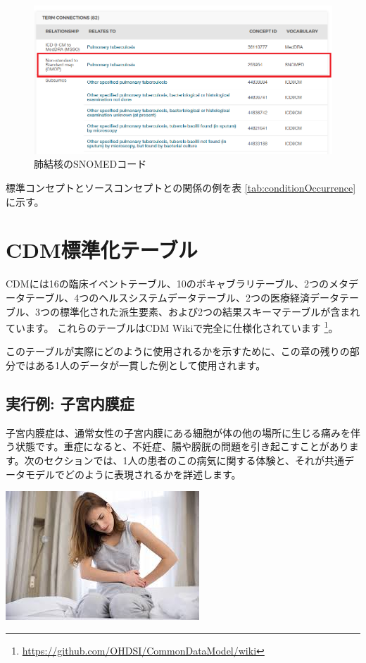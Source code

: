 \documentclass[
  11pt]{book}
\theoremstyle{definition}
\theoremstyle{definition}
\theoremstyle{definition}
\theoremstyle{definition}
\theoremstyle{remark}
\begin{document}
\begin{figure}
\includegraphics[width=1\linewidth]{images/CommonDataModel/pulmTubMap} \caption{肺結核のSNOMEDコード}\label{fig:pulmTubMap}
\end{figure}

標準コンセプトとソースコンセプトとの関係の例を表 \ref{tab:conditionOccurrence}に示す。

\section{CDM標準化テーブル}\label{cdmux6a19ux6e96ux5316ux30c6ux30fcux30d6ux30eb}


CDMには16の臨床イベントテーブル、10のボキャブラリテーブル、2つのメタデータテーブル、4つのヘルスシステムデータテーブル、2つの医療経済データテーブル、3つの標準化された派生要素、および2つの結果スキーマテーブルが含まれています。 これらのテーブルはCDM Wikiで完全に仕様化されています \footnote{\url{https://github.com/OHDSI/CommonDataModel/wiki}}。

このテーブルが実際にどのように使用されるかを示すために、この章の残りの部分ではある1人のデータが一貫した例として使用されます。

\subsection{実行例: 子宮内膜症}\label{ux5b9fux884cux4f8b-ux5b50ux5baeux5185ux819cux75c7}

子宮内膜症は、通常女性の子宮内膜にある細胞が体の他の場所に生じる痛みを伴う状態です。重症になると、不妊症、腸や膀胱の問題を引き起こすことがあります。次のセクションでは、1人の患者のこの病気に関する体験と、それが共通データモデルでどのように表現されるかを詳述します。

\begin{center}\includegraphics[width=0.5\linewidth]{images/CommonDataModel/Lauren} \end{center}
\end{document}
